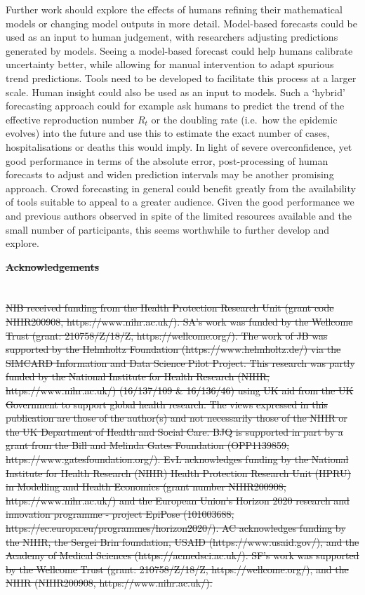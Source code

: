 \documentclass[10pt,letterpaper]{article}
\providecommand{\DIFaddtex}[1]{{\protect\color{blue}\uwave{#1}}} %
\providecommand{\DIFdeltex}[1]{{\protect\color{red}\sout{#1}}}                      %
\providecommand{\DIFaddbegin}{} %
\providecommand{\DIFaddend}{} %
\providecommand{\DIFdelbegin}{} %
\providecommand{\DIFdelend}{} %
\providecommand{\DIFadd}[1]{\texorpdfstring{\DIFaddtex{#1}}{#1}} %
\providecommand{\DIFdel}[1]{\texorpdfstring{\DIFdeltex{#1}}{}} %
\newcommand{\DIFscaledelfig}{0.5}
\newlength{\DIFdelgraphicswidth} %
\newlength{\DIFdelgraphicsheight} %
\newcommand{\DIFaddincludegraphics}[2][]{{\color{blue}\fbox{\DIFOincludegraphics[#1]{#2}}}} %
\newcommand{\DIFdelincludegraphics}[2][]{%
\sbox{\DIFdelgraphicsbox}{\DIFOincludegraphics[#1]{#2}}%
\settoboxwidth{\DIFdelgraphicswidth}{\DIFdelgraphicsbox} %
\settoboxtotalheight{\DIFdelgraphicsheight}{\DIFdelgraphicsbox} %
\scalebox{\DIFscaledelfig}{%
\parbox[b]{\DIFdelgraphicswidth}{\usebox{\DIFdelgraphicsbox}\\[-\baselineskip] \rule{\DIFdelgraphicswidth}{0em}}\llap{\resizebox{\DIFdelgraphicswidth}{\DIFdelgraphicsheight}{%
\setlength{\unitlength}{\DIFdelgraphicswidth}%
\begin{picture}(1,1)%
\thicklines\linethickness{2pt} %
{\color[rgb]{1,0,0}\put(0,0){\framebox(1,1){}}}%
{\color[rgb]{1,0,0}\put(0,0){\line( 1,1){1}}}%
{\color[rgb]{1,0,0}\put(0,1){\line(1,-1){1}}}%
\end{picture}%
}\hspace*{3pt}}} %
} %
\DeclareRobustCommand{\DIFaddbegin}{\DIFOaddbegin \let\includegraphics\DIFaddincludegraphics} %
\DeclareRobustCommand{\DIFaddend}{\DIFOaddend \let\includegraphics\DIFOincludegraphics} %
\DeclareRobustCommand{\DIFdelbegin}{\DIFOdelbegin \let\includegraphics\DIFdelincludegraphics} %
\DeclareRobustCommand{\DIFdelend}{\DIFOaddend \let\includegraphics\DIFOincludegraphics} %
\begin{document}
Further work should explore the effects of humans refining their
mathematical models or changing model outputs in more detail.
Model-based forecasts could be used as an input to human judgement, with
researchers adjusting predictions generated by models. Seeing a
model-based forecast could help humans calibrate uncertainty better,
while allowing for manual intervention to adapt spurious trend
predictions. Tools need to be developed to facilitate this process at a
larger scale. Human insight could also be used as an input to models.
Such a `hybrid' forecasting approach could for example ask humans to
predict the trend of the effective reproduction number \(R_t\) or the
doubling rate (i.e.~how the epidemic evolves) into the future and use
this to estimate the exact number of cases, hospitalisations or deaths
this would imply. In light of severe overconfidence, yet good
performance in terms of the absolute error, post-processing of human
forecasts to adjust and widen prediction intervals may be another
promising approach. Crowd forecasting in general could benefit greatly
from the availability of tools suitable to appeal to a greater audience.
Given the good performance we and previous authors observed in spite of
the limited resources available and the small number of participants,
this seems worthwhile to further develop and explore.

\clearpage

\DIFdelbegin \textbf{\DIFdel{Acknowledgements}}
\DIFdelend \DIFaddbegin \section*{\DIFadd{References}}
\DIFaddend 

\DIFdelbegin \DIFdel{NIB received funding from the Health Protection Research Unit (grant
code NIHR200908, https://www.nihr.ac.uk/). SA's work was funded by the
Wellcome Trust (grant: 210758/Z/18/Z, https://wellcome.org/). The work
of JB was supported by the Helmholtz Foundation
(https://www.helmholtz.de/) via the SIMCARD Information and Data Science
Pilot Project. This research was partly funded by the National Institute
for Health Research (NIHR, https://www.nihr.ac.uk/) (16/137/109 \&
16/136/46) using UK aid from the UK Government to support global health
research. The views expressed in this publication are those of the
author(s) and not necessarily those of the NIHR or the UK Department of
Health and Social Care. BJQ is supported in part by a grant from the
Bill and Melinda Gates Foundation (OPP1139859,
https://www.gatesfoundation.org/). EvL acknowledges funding by the
National Institute for Health Research (NIHR) Health Protection Research
Unit (HPRU) in Modelling and Health Economics (grant number NIHR200908,
https://www.nihr.ac.uk/) and the European Union's Horizon 2020 research
and innovation programme - project EpiPose (101003688,
https://ec.europa.eu/programmes/horizon2020/). AC acknowledges funding
by the NIHR, the Sergei Brin foundation, USAID (https://www.usaid.gov/),
and the Academy of Medical Sciences (https://acmedsci.ac.uk/). SF's work
was supported by the Wellcome Trust (grant: 210758/Z/18/Z,
https://wellcome.org/), and the NIHR (NIHR200908,
https://www.nihr.ac.uk/).
}%
\end{document}
